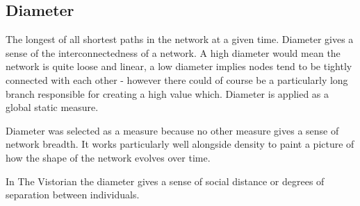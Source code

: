 
\subsection{Diameter}
The longest of all shortest paths in the network at a given time. Diameter gives a sense of the interconnectedness of a network. A high diameter would mean the network is quite loose and linear, a low diameter implies nodes tend to be tightly connected with each other - however there could of course be a particularly long branch responsible for creating a high value which. Diameter is applied as a global static measure.

Diameter was selected as a measure because no other measure gives a sense of network breadth. It works particularly well alongside density to paint a picture of how the shape of the network evolves over time.

In The Vistorian the diameter gives a sense of social distance or degrees of separation between individuals.

